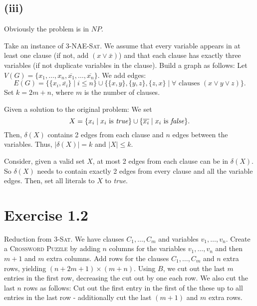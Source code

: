 \documentclass[oneside,a4paper]{amsart}
\newcommand{\NP}{\ensuremath{N \! P}}
\begin{document}
\subsection*{(iii)}
Obviously the problem is in \NP.

Take an instance of \textsc{3-NAE-Sat}. We assume that every variable appears in at least one clause (if not, add $(x \vee \bar{x})$) and that each clause has exactly three variables (if not duplicate variables in the clause).
Build a graph as follows: Let $V(G) = \{ x_1, \ldots, x_n, \overline{x_1}, \ldots, \overline{x_n} \}$. We add edges:
\[
	E(G) = \{ \{ x_i, \overline{x_i}\} \mid i \leq n\} \cup \{ \{ x, y \}, \{ y, z \}, \{ z, x \} \mid \forall \text{ clauses } (x \vee y \vee z) \}.
\]
Set $k = 2m + n$, where $m$ is the number of clauses.

Given a solution to the original problem: We set
\[
	X = \{ x_i \mid x_i \text{ is \textit{true}} \} \cup \{ \overline{x_i} \mid x_i \text{ is \textit{false}} \}.
\]
Then, $\delta(X)$ contains 2 edges from each clause and $n$ edges between the variables.
Thus, $|\delta(X)| = k$ and $|X| \leq k$.

Consider, given a valid set $X$, at most 2 edges from each clause can be in $\delta(X)$.
So $\delta(X)$ needs to contain exactly 2 edges from every clause and all the variable edges.
Then, set all literals to $X$ to \textit{true}.
\section*{Exercise 1.2}
Reduction from \textsc{3-Sat}. We have clauses $C_1, \ldots, C_m$ and variables $v_1, \ldots, v_n$. Create a \textsc{Crossword Puzzle} by adding $n$ columns for the variables $v_1, \ldots, v_n$ and then $m+1$ and $m$ extra columns. Add rows for the clauses $C_1, \ldots, C_m$ and $n$ extra rows, yielding $(n + 2m + 1) \times (m+ n)$. Using $B$, we cut out the last $m$ entries in the first row, decreasing the cut out by one each row. We also cut the last $n$ rows as follows: Cut out the first entry in the first of the these up to all entries in the last row - additionally cut the last $(m + 1)$ and $m$ extra rows.
\end{document}
